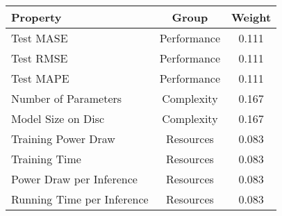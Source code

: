 
    \begin{tabular}{lcc}
        \toprule 
        Property & Group & Weight \\
        \midrule
        Test MASE & Performance & 0.111 \\
        Test RMSE & Performance & 0.111 \\
        Test MAPE & Performance & 0.111 \\
        Number of Parameters & Complexity & 0.167 \\
        Model Size on Disc & Complexity & 0.167 \\
        Training Power Draw & Resources & 0.083 \\
        Training Time & Resources & 0.083 \\
        Power Draw per Inference & Resources & 0.083 \\
        Running Time per Inference & Resources & 0.083 \\
        \bottomrule
    \end{tabular}